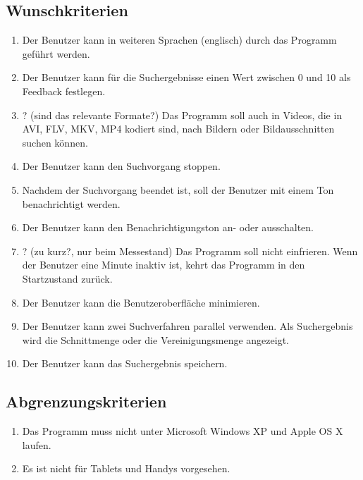 \subsection{Wunschkriterien}
\begin{enumerate} [label=\bfseries /WK \arabic*0/]
\item Der Benutzer kann in weiteren Sprachen (englisch) durch das Programm geführt werden.
\item Der Benutzer kann für die Suchergebnisse einen Wert zwischen 0 und 10 als Feedback festlegen.
\item ? (sind das relevante Formate?) Das Programm soll auch in Videos, die in AVI, FLV, MKV, MP4 kodiert sind, nach Bildern oder Bildausschnitten suchen können.
\item Der Benutzer kann den Suchvorgang stoppen.
\item Nachdem der Suchvorgang beendet ist, soll der Benutzer mit einem Ton benachrichtigt werden.
\item Der Benutzer kann den Benachrichtigungston an- oder ausschalten.
\item ? (zu kurz?, nur beim Messestand) Das Programm soll nicht einfrieren. Wenn der Benutzer eine Minute inaktiv ist, kehrt das Programm in den Startzustand zurück.
\item Der Benutzer kann die Benutzeroberfläche minimieren. 
\item Der Benutzer kann zwei Suchverfahren parallel verwenden. Als Suchergebnis wird die Schnittmenge oder die Vereinigungsmenge angezeigt.
\item Der Benutzer kann das Suchergebnis speichern. 
\end{enumerate}
\subsection{Abgrenzungskriterien}
\begin{enumerate} [label=\bfseries /AK \arabic*0/]
\item Das Programm muss nicht unter Microsoft Windows XP und  Apple OS X laufen. 
\item Es ist nicht für Tablets und Handys vorgesehen.
\end{enumerate}
